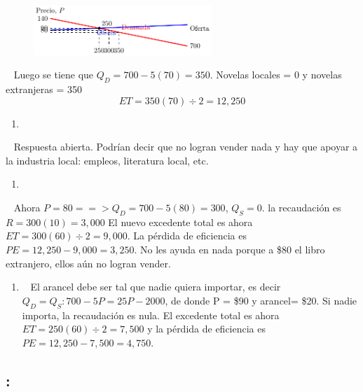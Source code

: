 \documentclass[
  letterpaper,
  DIV=11,
  numbers=noendperiod]{scrreport}
\providecommand{\tightlist}{%
  \setlength{\itemsep}{0pt}\setlength{\parskip}{0pt}}\usepackage{longtable,booktabs,array}
\begin{document}
\begin{figure}

{\centering \includegraphics[width=0.6\textwidth,height=\textheight]{7,8titulo_files/figure-pdf/unnamed-chunk-13-1.pdf}

}

\end{figure}

~ Luego se tiene que \(Q_D = 700 - 5(70) = 350\). Novelas locales = 0 y
novelas extranjeras = 350 \[ET = 350(70)\div2 = 12,250\]

\begin{enumerate}
\def\labelenumi{\alph{enumi})}
\setcounter{enumi}{1}
\tightlist
\item
\end{enumerate}

~ Respuesta abierta. Podrían decir que no logran vender nada y hay que
apoyar a la industria local: empleos, literatura local, etc.

\begin{enumerate}
\def\labelenumi{\alph{enumi})}
\setcounter{enumi}{2}
\tightlist
\item
\end{enumerate}

~ Ahora \(P = 80 ==> Q_D = 700 - 5(80) = 300\), \(Q_S = 0\). la
recaudación es \(R = 300(10) = 3,000\) El nuevo excedente total es ahora
\(ET = 300(60)\div2 = 9,000\). La pérdida de eficiencia es
\(PE = 12, 250 - 9, 000 = 3, 250\). No les ayuda en nada porque a \$80
el libro extranjero, ellos aún no logran vender.

\begin{enumerate}
\def\labelenumi{\alph{enumi})}
\setcounter{enumi}{3}
\tightlist
\item
  ~ El arancel debe ser tal que nadie quiera importar, es decir
  \(Q_D = Q_S: 700 - 5P = 25P - 2000\), de donde P = \$90 y arancel=
  \$20. Si nadie importa, la recaudación es nula. El excedente total es
  ahora \(ET = 250(60)\div2 = 7,500\) y la pérdida de eficiencia es
  \(PE = 12,250 - 7,500 = 4,750\).
\end{enumerate}

\hypertarget{section-14}{%
\subsection{:}\label{section-14}}
\end{document}

